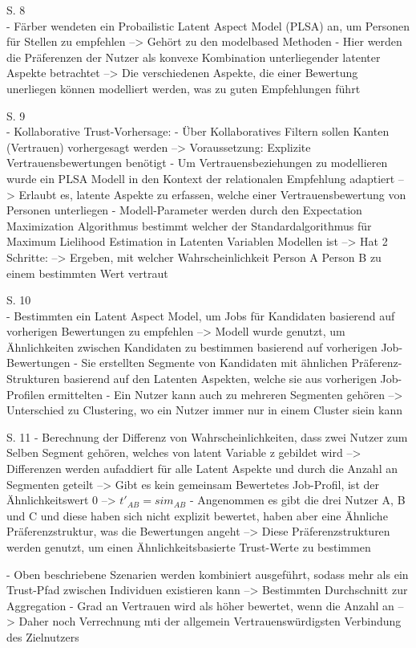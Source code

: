 S. 8\\
- Färber wendeten ein Probailistic Latent Aspect Model (PLSA) an, um Personen für Stellen zu empfehlen --> Gehört zu den modelbased Methoden
- Hier werden die Präferenzen der Nutzer als konvexe Kombination unterliegender latenter Aspekte betrachtet --> Die verschiedenen Aspekte, die einer Bewertung unerliegen können modelliert werden, was zu guten Empfehlungen führt

S. 9\\
- Kollaborative Trust-Vorhersage:
- Über Kollaboratives Filtern sollen Kanten (Vertrauen) vorhergesagt werden --> Voraussetzung: Explizite Vertrauensbewertungen benötigt
- Um Vertrauensbeziehungen zu modellieren wurde ein PLSA Modell in den Kontext der relationalen Empfehlung adaptiert --> Erlaubt es, latente Aspekte zu erfassen, welche einer Vertrauensbewertung von Personen unterliegen
- Modell-Parameter werden durch den Expectation Maximization Algorithmus bestimmt welcher der Standardalgorithmus für Maximum Lielihood Estimation in Latenten Variablen Modellen ist --> Hat 2 Schritte: --> Ergeben, mit welcher Wahrscheinlichkeit Person A Person B zu einem bestimmten Wert vertraut

S. 10\\
- Bestimmten ein Latent Aspect Model, um Jobs für Kandidaten basierend auf vorherigen Bewertungen zu empfehlen --> Modell wurde genutzt, um Ähnlichkeiten zwischen Kandidaten zu bestimmen basierend auf vorherigen Job-Bewertungen
- Sie erstellten Segmente von Kandidaten mit ähnlichen Präferenz-Strukturen basierend auf den Latenten Aspekten, welche sie aus vorherigen Job-Profilen ermittelten
- Ein Nutzer kann auch zu mehreren Segmenten gehören --> Unterschied zu Clustering, wo ein Nutzer immer nur in einem Cluster siein kann

S. 11
- Berechnung der Differenz von Wahrscheinlichkeiten, dass zwei Nutzer zum Selben Segment gehören, welches von latent Variable z gebildet wird --> Differenzen werden aufaddiert für alle Latent Aspekte und durch die Anzahl an Segmenten geteilt --> Gibt es kein gemeinsam Bewertetes Job-Profil, ist der Ähnlichkeitswert 0 --> $t'_{AB}=sim_{AB}$
- Angenommen es gibt die drei Nutzer A, B und C und diese haben sich nicht explizit bewertet, haben aber eine Ähnliche Präferenzstruktur, was die Bewertungen angeht --> Diese Präferenzstrukturen werden genutzt, um einen Ähnlichkeitsbasierte Trust-Werte zu bestimmen

- Oben beschriebene Szenarien werden kombiniert ausgeführt, sodass mehr als ein Trust-Pfad zwischen Individuen existieren kann --> Bestimmten Durchschnitt zur Aggregation
- Grad an Vertrauen wird als höher bewertet, wenn die Anzahl an --> Daher noch Verrechnung mti der allgemein Vertrauenswürdigsten Verbindung des Zielnutzers

